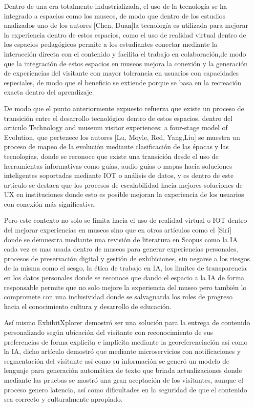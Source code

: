 \documentclass[pdflatex,sn-mathphys-num]{sn-jnl}%
\theoremstyle{thmstyleone}%
\theoremstyle{thmstyletwo}%
\theoremstyle{thmstylethree}%
\begin{document}
Dentro de una era totalmente industrializada, el uso de la tecnología se ha integrado a espacios como los museos, de modo que dentro de los estudios analizados uno de los autores [Chen, Duan]la tecnología es utilizada para mejorar la experiencia dentro de estos espacios, como el uso de realidad virtual dentro de los espacios pedagógicos permite a los estudiantes conectar mediante la interacción directa con el contenido y facilita el trabajo en colaboración,\cite{Chen2021}de modo que la integración de estos espacios en museos mejora la conexión y la generación de experiencias del visitante con mayor tolerancia en usuarios con capacidades especiales, de modo que el beneficio se extiende porque se basa en la recreación exacta dentro del aprendizaje.

De modo que el punto anteriormente expuesto refuerza que existe un proceso de transición entre el desarrollo tecnológico dentro de estos espacios, dentro del articulo Technology and museum visitor experiences: a four-stage model of Evolution, que pertenece los autores [Lu, Moyle, Red, Yang,Liu] se muestra un proceso de mapeo de la evolución mediante clasificación de las épocas y las tecnologías, donde se reconoce que existe una transición desde el uso de herramientas informativas como guías, audio guías o mapas hacia soluciones inteligentes soportadas mediante IOT o análisis de datos, y es dentro de este articulo se destaca que los procesos de escalabilidad hacia mejores soluciones de UX en instituciones donde esto es posible mejoran la experiencia de los usuarios con conexión más significativa.\cite{Lu2023}

Pero este contexto no solo se limita hacia el uso de realidad virtual o IOT dentro del mejorar experiencias en museos sino que en otros artículos como el [Siri] donde se demuestra mediante una revisión de literatura en Scopus como la IA cada vez es mas usada dentro de museos para generar experiencias personales, procesos de preservación digital y gestión de exhibiciones, sin negarse a los riesgos de la misma como el sesgo, la ética de trabajo en IA, los limites de transparencia en los datos personales donde se reconoce que dando el espacio a la IA de forma responsable permite que no solo mejore la experiencia del museo pero también lo compromete con una inclusividad donde se salvaguarda los roles de progreso hacia el conocimiento cultura y desarrollo de educación.\cite{Siri20242038}

Así mismo ExhibitXplorer demostró ser una solución para la entrega de contenido personalizado según ubicación del visitante con reconocimiento de sus preferencias de forma explícita e implícita mediante la georeferenciación así como la IA, dicho artículo demostró que mediante microservicios con notificaciones y segmentación del visitante así como su información se generó un modelo de lenguaje para generación automática de texto que brinda actualizaciones donde mediante las pruebas se mostró una gran aceptación de los visitantes, aunque el proceso genero latencia, así como dificultades en la seguridad de que el contenido sea correcto y culturalmente apropiado.\cite{ijgi12100434}
\end{document}

